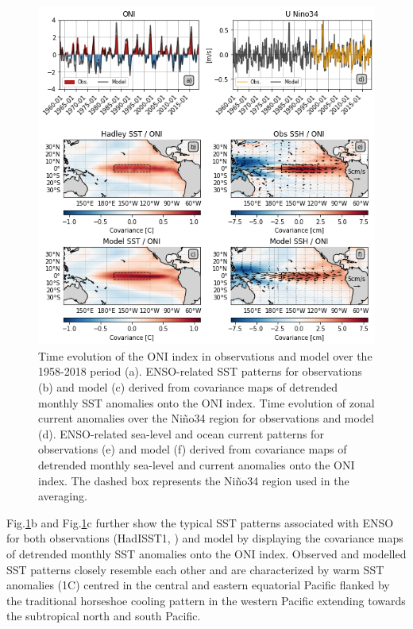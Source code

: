\begin{figure}[h!tp]
	\centering
	\includegraphics[scale=0.6]{figs/fig1.png}
	\caption{Time evolution of the ONI index in observations and model over the 1958-2018 period (a). ENSO-related SST patterns for observations \citep{raynerGlobalAnalysesSea2003} (b) and model (c) derived from covariance maps of detrended monthly SST anomalies onto the ONI index. Time evolution of zonal current anomalies over the Niño34 region for observations \citep{rioGOCEOceanCirculation2014} and model (d). ENSO-related sea-level and ocean current patterns for observations (e) and model (f) derived from covariance maps of detrended monthly sea-level and current anomalies onto the ONI index. The dashed box represents the Niño34 region used in the averaging.}
	\label{fig:nemo-had-sst}
\end{figure}

Fig.\ref{fig:nemo-had-sst}b and Fig.\ref{fig:nemo-had-sst}c further show the typical SST patterns associated with ENSO for both observations (HadISST1, \citealp{raynerGlobalAnalysesSea2003}) and model by displaying the covariance maps of detrended monthly SST anomalies onto the ONI index. Observed and modelled SST patterns closely resemble each other and are characterized by warm SST anomalies (1\degree{}C) centred in the central and eastern equatorial Pacific  flanked by the traditional horseshoe cooling pattern in the western Pacific extending towards the subtropical north and south Pacific.    


